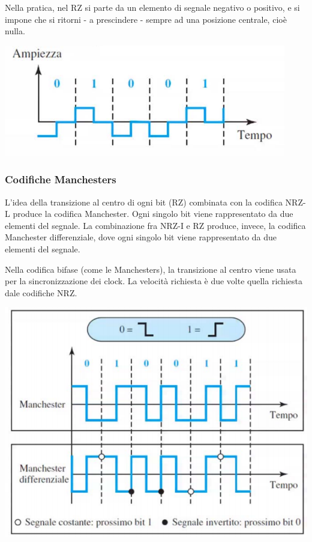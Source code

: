             Nella pratica, nel RZ si parte da un elemento di segnale negativo o positivo, e si impone che si ritorni - a prescindere - sempre ad una posizione centrale, cioè nulla.
            
            \begin{center}
                \includegraphics[scale=0.5]{images/RZ.png}
            \end{center}
        
        \subsubsection{Codifiche Manchesters}
        
            L'idea della transizione al centro di ogni bit (RZ) combinata con la codifica NRZ-L produce la codifica Manchester. Ogni singolo bit viene rappresentato da due elementi del segnale. La combinazione fra NRZ-I e RZ produce, invece, la codifica Manchester differenziale, dove ogni singolo bit viene rappresentato da due elementi del segnale.
            
            Nella codifica bifase (come le Manchesters), la transizione al centro viene usata per la sincronizzazione dei clock. La velocità richiesta è due volte quella richiesta dale codifiche NRZ.
            
            \begin{center}
                \includegraphics[scale=0.5]{images/Manchesters.png}
            \end{center}
        
